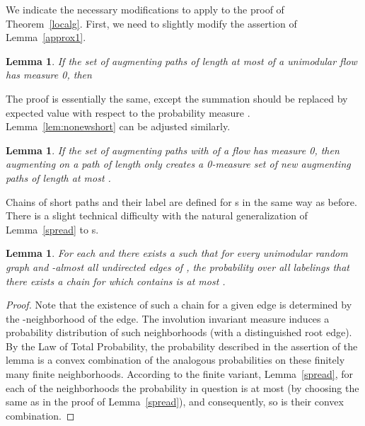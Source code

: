 \documentclass[12pt,a4paper]{article}
\newtheorem{Lemma}[Theorem]{Lemma}
\renewcommand{\:}{\colon}
\begin{document}
We indicate the necessary modifications to apply to the proof of Theorem~\ref{localg}. 
First, we need to slightly modify the assertion of Lemma~\ref{approx1}. 

\begin{Lemma} \label{approx1uni}
If the set of augmenting paths of length at most  of a unimodular flow  has  measure 0, then

\end{Lemma}

The proof is essentially the same, except the summation should be replaced by expected value with respect to the probability measure . 
Lemma~\ref{lem:nonewshort} can be adjusted similarly. 

\begin{Lemma}\label{lem:nonewshortuni}
If the set of augmenting paths  with  of a flow  has  measure 0, then augmenting on a path of length  only creates a 0-measure set of new augmenting paths of length at most .
\end{Lemma}

Chains of short paths and their label are defined for s in the same way as before. 
There is a slight technical difficulty with the natural generalization of Lemma~\ref{spread} to s.

\begin{Lemma} \label{spreaduni}
For each  and  there exists a  such that for every unimodular random graph  and -almost all undirected edges  of , the probability over all labelings that there exists a chain  for which  contains  is at most .
\end{Lemma}
\begin{proof}
Note that the existence of such a chain for a given edge is determined by the -neighborhood of the edge. 
The involution invariant measure induces a probability distribution of such neighborhoods (with a distinguished root edge). 
By the Law of Total Probability, the probability described in the assertion of the lemma is a convex combination of the analogous probabilities on these finitely many finite neighborhoods. 
According to the finite variant, Lemma~\ref{spread}, for each of the neighborhoods the probability in question is at most  (by choosing the same  as in the proof of Lemma~\ref{spread}), and consequently, so is their convex combination. 
\end{proof}
\end{document}
